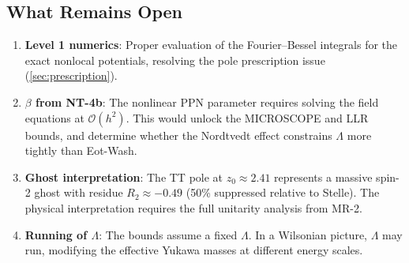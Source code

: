 \documentclass[11pt,a4paper]{article}
\newcommand{\order}{\mathcal{O}}
\begin{document}
\subsection{What Remains Open}

\begin{enumerate}[label=\arabic*., leftmargin=2em]
  \item \textbf{Level 1 numerics}: Proper evaluation of the
    Fourier--Bessel integrals for the exact nonlocal potentials,
    resolving the pole prescription issue
    (\cref{sec:prescription}).

  \item \textbf{$\beta$ from NT-4b}: The nonlinear PPN parameter requires
    solving the field equations at $\order(h^2)$.  This would unlock the
    MICROSCOPE and LLR bounds, and determine whether the Nordtvedt effect
    constrains $\Lambda$ more tightly than Eot-Wash.

  \item \textbf{Ghost interpretation}: The TT pole at $z_0 \approx 2.41$
    represents a massive spin-2 ghost with residue
    $R_2 \approx -0.49$ (50\% suppressed relative to Stelle).  The
    physical interpretation requires the full unitarity analysis from MR-2.

  \item \textbf{Running of $\Lambda$}: The bounds assume a fixed
    $\Lambda$.  In a Wilsonian picture, $\Lambda$ may run, modifying the
    effective Yukawa masses at different energy scales.
\end{enumerate}


\end{document}
